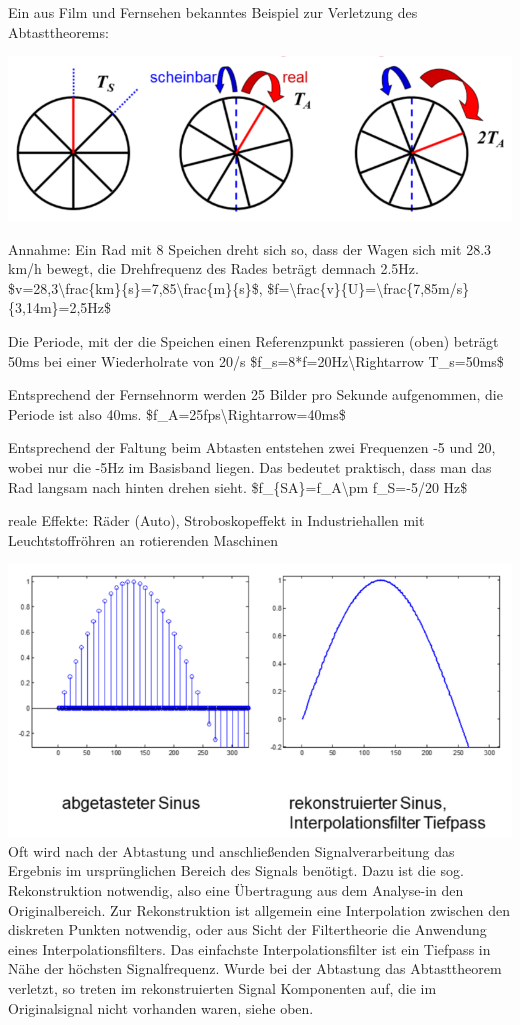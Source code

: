\documentclass[a4paper]{article}
\begin{document}
\begin{multicols}{3}
  Ein aus Film und Fernsehen bekanntes Beispiel zur Verletzung des
  Abtasttheorems:

  \begin{itemize*}
    \item \includegraphics[width=.5\linewidth]{Assets/Biosignalverarbeitung-beispiel-film.png}
    \item Annahme: Ein Rad mit 8 Speichen dreht sich so, dass der Wagen sich mit 28.3 km/h bewegt, die Drehfrequenz des Rades beträgt demnach 2.5Hz. \$v=28,3\textbackslash frac\{km\}\{s\}=7,85\textbackslash frac\{m\}\{s\}\$, \$f=\textbackslash frac\{v\}\{U\}=\textbackslash frac\{7,85m/s\}\{3,14m\}=2,5Hz\$
    \item Die Periode, mit der die Speichen einen Referenzpunkt passieren (oben) beträgt 50ms bei einer Wiederholrate von 20/s \$f\_s=8*f=20Hz\textbackslash Rightarrow T\_s=50ms\$
    \item Entsprechend der Fernsehnorm werden 25 Bilder pro Sekunde aufgenommen, die Periode ist also 40ms. \$f\_A=25fps\textbackslash Rightarrow=40ms\$
    \item Entsprechend der Faltung beim Abtasten entstehen zwei Frequenzen -5 und 20, wobei nur die -5Hz im Basisband liegen. Das bedeutet praktisch, dass man das Rad langsam nach hinten drehen sieht. \$f\_\{SA\}=f\_A\textbackslash pm f\_S=-5/20 Hz\$
    \item reale Effekte: Räder (Auto), Stroboskopeffekt in Industriehallen mit Leuchtstoffröhren an rotierenden Maschinen
  \end{itemize*}

  \includegraphics[width=.5\linewidth]{Assets/Biosignalverarbeitung-rekonstruierter-sinus.png}
  Oft wird nach der Abtastung und anschließenden Signalverarbeitung das
  Ergebnis im ursprünglichen Bereich des Signals benötigt. Dazu ist die
  sog. Rekonstruktion notwendig, also eine Übertragung aus dem Analyse-in
  den Originalbereich. Zur Rekonstruktion ist allgemein eine Interpolation
  zwischen den diskreten Punkten notwendig, oder aus Sicht der
  Filtertheorie die Anwendung eines Interpolationsfilters. Das einfachste
  Interpolationsfilter ist ein Tiefpass in Nähe der höchsten
  Signalfrequenz. Wurde bei der Abtastung das Abtasttheorem verletzt, so
  treten im rekonstruierten Signal Komponenten auf, die im Originalsignal
  nicht vorhanden waren, siehe oben.


\end{multicols}
\end{document}
